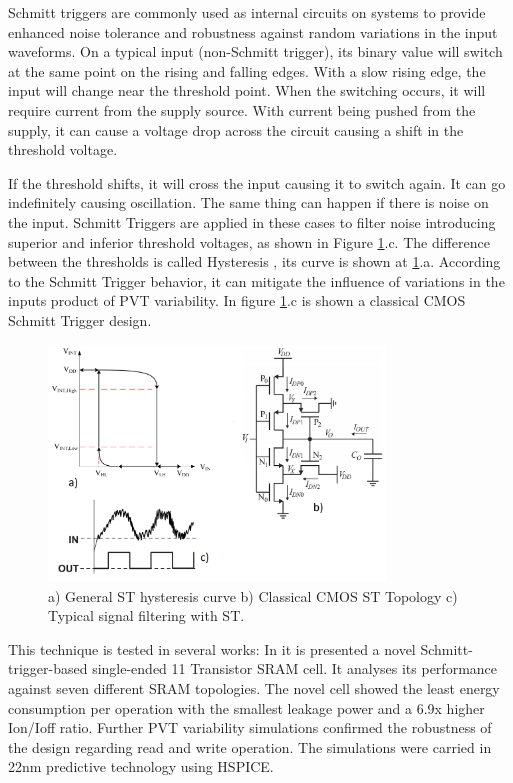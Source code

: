 \documentclass[ecp,tc, english]{iiufrgs}
\begin{document}
Schmitt triggers are commonly used as internal circuits on systems to provide enhanced noise tolerance and robustness against random variations in the input waveforms. On a typical input (non-Schmitt trigger), its binary value will switch at the same point on the rising and falling edges. With a slow rising edge, the input will change near the threshold point. When the switching occurs, it will require current from the supply source. With current being pushed from the supply, it can cause a voltage drop across the circuit causing a shift in the threshold voltage. 

If the threshold shifts, it will cross the input causing it to switch again. It can go indefinitely causing oscillation. The same thing can happen if there is noise on the input. Schmitt Triggers are applied in these cases to filter noise introducing superior and inferior threshold voltages, as shown in Figure \ref{fig:Fig3}.c. The difference between the thresholds is called Hysteresis \cite{WinNT}, its curve is shown at \ref{fig:Fig3}.a. According to the Schmitt Trigger behavior, it can mitigate the influence of variations in the inputs product of PVT variability. In figure \ref{fig:Fig3}.c is shown a classical CMOS Schmitt Trigger design. 

\begin{figure}[H]
\centering
\includegraphics[width=0.8\textwidth]{Hysteresis.png}
\caption{a) General ST hysteresis curve b) Classical CMOS ST Topology c) Typical signal filtering with ST.}
\label{fig:Fig3}
\end{figure}

This technique is tested in several works: In \cite{ahmad2016single} it is presented a novel Schmitt-trigger-based single-ended 11 Transistor SRAM cell. It analyses its performance against seven different SRAM topologies. The novel cell showed the least energy consumption per operation with the smallest leakage power and a 6.9x higher Ion/Ioff ratio. Further PVT variability simulations confirmed the robustness of the design regarding read and write operation. The simulations were carried in 22nm predictive technology using HSPICE.
\end{document}
